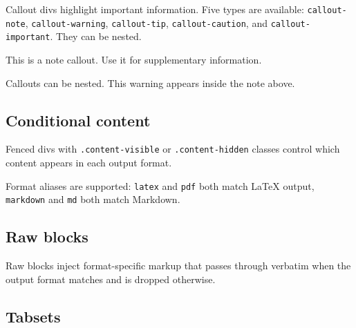 \documentclass[11pt]{article}
\begin{document}
Callout divs highlight important information. Five types are available: \texttt{callout-note}, \texttt{callout-warning}, \texttt{callout-tip}, \texttt{callout-caution}, and \texttt{callout-important}. They can be nested.




\begin{tcolorbox}[enhanced, breakable, colback=blue!5, colframe=blue!40,
  left=4pt, right=4pt, top=4pt, bottom=4pt,
  boxrule=0pt, leftrule=3pt, arc=0pt, outer arc=0pt,
  title=Note, fonttitle=\bfseries]
This is a note callout. Use it for supplementary information.




\begin{tcolorbox}[enhanced, breakable, colback=yellow!10, colframe=yellow!60!black,
  left=4pt, right=4pt, top=4pt, bottom=4pt,
  boxrule=0pt, leftrule=3pt, arc=0pt, outer arc=0pt,
  title=Warning, fonttitle=\bfseries]
Callouts can be nested. This warning appears inside the note above.



\end{tcolorbox}

\end{tcolorbox}

\subsection*{Conditional content}
\label{conditional-content}

Fenced divs with \texttt{.content-visible} or \texttt{.content-hidden} classes control which content appears in each output format.



Format aliases are supported: \texttt{latex} and \texttt{pdf} both match LaTeX output, \texttt{markdown} and \texttt{md} both match Markdown.

\subsection*{Raw blocks}
\label{raw-blocks}

Raw blocks inject format-specific markup that passes through verbatim when the output format matches and is dropped otherwise.



\subsection*{Tabsets}
\label{tabsets}
\end{document}
